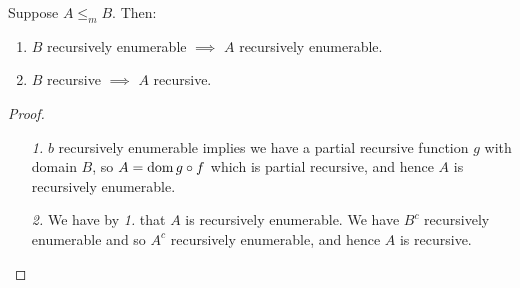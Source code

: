 \documentclass[10pt,a4paper]{article}
\begin{document}
\begin{lemma}
Suppose $A \leq_m B$. Then: 
\begin{enumerate}
\item $B$ recursively enumerable $\implies$ $A$ recursively enumerable.
\item $B$ recursive $\implies$ $A$ recursive.
\end{enumerate}
\end{lemma}
\begin{proof}\item
\begin{itemize}
\item[\textit{1.}] $b$ recursively enumerable implies we have a partial recursive function $g$ with domain $B$, so $A = \operatorname{dom} g\circ f$ which is partial recursive, and hence $A$ is recursively enumerable.
\item[\textit{2.}] We have by \textit{1.} that $A$ is recursively enumerable. We have $B^c$ recursively enumerable and so $A^c$ recursively enumerable, and hence $A$ is recursive.
\end{itemize}
\end{proof}
\end{document}
